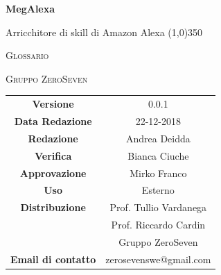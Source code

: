\documentclass[a4paper,12pt]{article}
\author{Mirko Franco}
\date{14-12-2018}
\begin{document}
\begin{titlepage}
	\centering
	{\huge\bfseries MegAlexa\par}
	Arricchitore di skill di Amazon Alexa
	\line(1,0){350} \\
	{\scshape\LARGE Glossario \par}
	\vspace{1cm}
	{\scshape Gruppo ZeroSeven \par}
	\logo
		\begin{tabular}{c|c}
		{\hfill \textbf{Versione}} 			& 0.0.1				\\
		{\hfill\textbf{Data Redazione}} 	& 22-12-2018		\\ 
		{\hfill\textbf{Redazione}} 			& Andrea Deidda			\\ 
		{\hfill\textbf{Verifica}} 				&  	Bianca Ciuche				\\ 
		{\hfill\textbf{Approvazione}} 		&  		Mirko Franco			\\ 
		{\hfill\textbf{Uso}} 					& 		Esterno		\\ 
		{\hfill\textbf{Distribuzione}} 			& 			Prof. Tullio Vardanega \\ & Prof. Riccardo Cardin \\ & Gruppo ZeroSeven		\\ 
		{\hfill\textbf{Email di contatto}} & zerosevenswe@gmail.com \\
	\end{tabular}
\end{titlepage}

	\label{LastFrontPage}
	\newpage	
	
	\pagestyle{mymain}
	\tableofcontents
		
	
	
	
	
	
	
	
	
	
	
	
	
	
	
	
	
	
	
	
	
	
	
	\printindex
	\label{LastPage}
	
	
\end{document}

